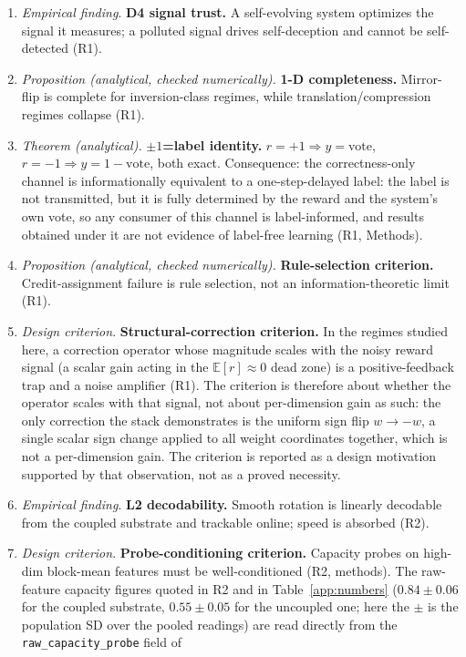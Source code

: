 \documentclass[preprint,12pt]{elsarticle}
\begin{document}
\begin{enumerate}[label=\arabic*.]
theorem (theory).
\item \emph{Empirical finding}. \textbf{D4 signal trust.} A self-evolving system optimizes the signal
it measures; a polluted signal drives self-deception and cannot be
self-detected (R1).
\item \emph{Proposition (analytical, checked numerically).} \textbf{1-D completeness.} Mirror-flip is complete for
inversion-class regimes, while translation/compression regimes collapse
(R1).
\item \emph{Theorem (analytical).} \textbf{$\pm1$=label identity.} $r=+1\Rightarrow y=\mathrm{vote}$,
$r=-1\Rightarrow y=1-\mathrm{vote}$, both exact. Consequence: the
correctness-only channel is informationally equivalent to a one-step-delayed
label: the label is not transmitted, but it is fully determined by the
reward and the system's own vote, so any consumer of this channel is
label-informed, and results obtained under it are not evidence of
label-free learning (R1, Methods).
\item \emph{Proposition (analytical, checked numerically).} \textbf{Rule-selection criterion.} Credit-assignment failure is rule
selection, not an information-theoretic limit (R1).
\item \emph{Design criterion}. \textbf{Structural-correction criterion.} In the
regimes studied here, a correction operator whose magnitude scales with the
noisy reward signal (a scalar gain acting in the $\mathbb E[r]\approx0$
dead zone) is a positive-feedback trap and a noise amplifier (R1). The
criterion is therefore about whether the operator scales with that signal,
not about per-dimension gain as such: the only correction the stack
demonstrates is the uniform sign flip $w\to-w$, a single scalar sign change
applied to all weight coordinates together, which is not a per-dimension
gain. The criterion is reported as a design motivation supported by that
observation, not as a proved necessity.
\item \emph{Empirical finding}. \textbf{L2 decodability.} Smooth rotation is linearly decodable from
the coupled substrate and trackable online; speed is absorbed (R2).
\item \emph{Design criterion}. \textbf{Probe-conditioning criterion.} Capacity probes on high-dim
block-mean features must be well-conditioned (R2, methods). The raw-feature
capacity figures quoted in R2 and in Table~\ref{app:numbers}
($0.84\pm0.06$ for the coupled substrate, $0.55\pm0.05$ for the uncoupled one; here the $\pm$ is the population SD over the pooled readings)
are read directly from the \texttt{raw\_capacity\_probe} field of

\end{enumerate}
\end{document}
